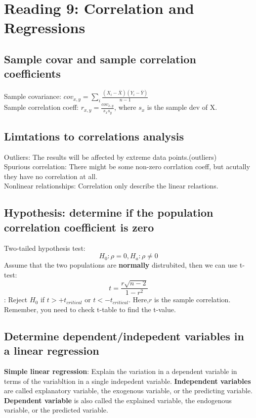 \documentclass{article}
\begin{document}
\tableofcontents
\newpage
\section{Reading 9: Correlation and Regressions}
\subsection{Sample covar and sample correlation coefficients}
Sample covariance: $cov_{x,y}=\sum_i \frac{(X_i-\bar X)(Y_i-\bar Y)}{n-1}$
\\Sample correlation coeff: 
$r_{x,y}=\frac{cov_{x,y}}{s_x s_y}$, where $s_x$ is the sample dev of X.
\subsection{Limtations to correlations analysis}
Outliers: The results will be affected by extreme data points.(outliers)\\
Spurious correlation: There might be some non-zero corrlation coeff, but 
acutally they have no correlation at all.\\
Nonlinear relationships: Correlation only describe the linear relastions.
\subsection{Hypothesis: determine if the population 
correlation coefficient is zero}
Two-tailed hypothesis test:
$$
H_0: \rho=0, H_a: \rho \neq 0
$$
Assume that the two populations are {\bf normally} distrubited, then we 
can use t-test:
$$
t=\frac{r\sqrt{n-2}}{1-r^2}
$$:
Reject $H_0$ if  $t>+t_{critical}$ or $t<-t_{critical}$. Here,$r$ is the
sample correlation. Remember, you need to check t-table to find the t-value.
\subsection{Determine dependent/indepedent variables in a linear regression}
{\bf Simple linear regression}: Explain the variation in a dependent variable 
in terms of the variabltion in a single indepedent variable.
{\bf Independent variables} are called explanatory variable, the exogenous 
variable, or the predicting variable. 
{\bf Dependent variable} is also called the explained variable, the endogenous 
variable, or the predicted variable.
\end{document}
